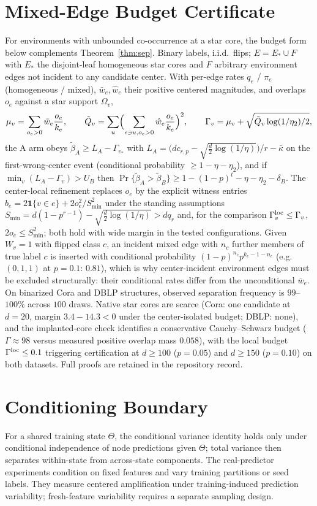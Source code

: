 \documentclass[preprint,11pt]{elsarticle}
\newcommand{\ind}[1]{\mathbf{1}\{#1\}}
\begin{document}
\section{Mixed-Edge Budget Certificate}\label{app:mixed}

For environments with unbounded co-occurrence at a star core, the
budget form below complements Theorem~\ref{thm:sep}. Binary labels,
i.i.d.\ flips; $E=E_\ast\cup F$ with $E_\ast$ the disjoint-leaf
homogeneous star cores and $F$ arbitrary environment edges not
incident to any candidate center. With per-edge rates $q_e$ /
$\pi_e$ (homogeneous / mixed), $\bar w_e,\hat w_e$ their positive
centered magnitudes, and overlaps $o_e$ against a star support
$\Omega_v$,
\[
\mu_v=\sum_{o_e>0}\bar w_e\frac{o_e}{k_e},\qquad
\tilde Q_v=\sum_u\Bigl(\sum_{e\ni u,o_e>0}\hat w_e\frac{o_e}{k_e}
\Bigr)^2,\qquad
\Gamma_v=\mu_v+\sqrt{\tilde Q_v\log(1/\eta_2)/2},
\]
the A arm obeys $\widetilde\beta_A\ge L_A-\Gamma_{v_\ast}$ with
$L_A=\bigl(dc_{r,p}-\sqrt{\tfrac d2\log(1/\eta)}\bigr)/r-\bar\kappa$
on the first-wrong-center event (conditional probability
$\ge1-\eta-\eta_2$), and if $\min_v(L_A-\Gamma_v)>U_B$ then
$\Pr\{\widetilde\beta_A>\widetilde\beta_B\}\ge
1-(1-p)^t-\eta-\eta_2-\delta_B$. The center-local refinement
replaces $o_e$ by the explicit witness entries $b_e
=2\ind{v\in e}+2o_e^2/S_{\min}^2$ under the standing assumptions
$S_{\min}=d(1-p^{r-1})-\sqrt{\tfrac d2\log(1/\eta)}>dq_r$ and, for
the comparison $\Gamma_v^{\rm loc}\le\Gamma_v$,
$2o_e\le S_{\min}^2$; both hold with wide margin in the tested
configurations. Given $W_v=1$ with flipped class $c$, an incident
mixed edge with $n_c$ further members of true label $c$ is inserted
with conditional probability $(1-p)^{n_c}p^{k_e-1-n_c}$ (e.g.\
$(0,1,1)$ at $p=0.1$: $0.81$), which is why center-incident
environment edges must be excluded structurally: their conditional
rates differ from the unconditional $\bar w_e$. On binarized Cora and
DBLP structures, observed separation frequency is $99$--$100\%$ across
$100$ draws. Native star cores are scarce (Cora: one candidate at
$d=20$, margin $3.4-14.3<0$ under the center-isolated budget; DBLP: none), and the
implanted-core check identifies a conservative Cauchy--Schwarz budget
($\Gamma\approx98$ versus measured positive overlap mass $0.058$),
with the local budget $\Gamma^{\rm loc}\le0.1$ triggering certification
at $d\ge100$ ($p=0.05$) and $d\ge150$ ($p=0.10$) on both datasets.
Full proofs are retained in the repository record.

\section{Conditioning Boundary}\label{app:identification}
For a shared training state $\Theta$, the conditional variance
identity holds only under conditional independence of node
predictions given $\Theta$; total variance then separates
within-state from across-state components. The real-predictor
experiments condition on fixed features and vary training partitions
or seed labels. They measure centered amplification under
training-induced prediction variability; fresh-feature variability
requires a separate sampling design.
\end{document}
